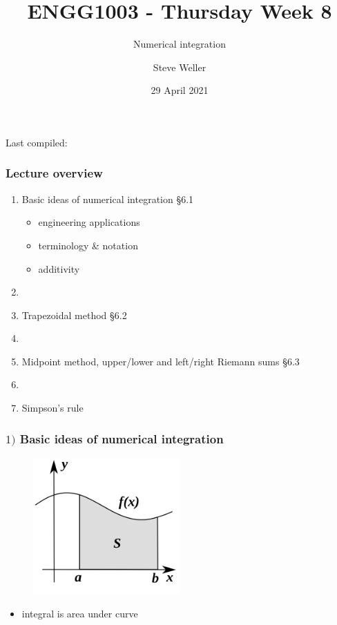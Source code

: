 \documentclass[english,14pt]{beamer}
\title{ENGG1003 - Thursday Week 8}
\subtitle{Numerical integration }%
\author{Steve Weller}
\institute{University of Newcastle}
\date{29 April 2021}
\newcommand\red[1]{{\color{red} #1}}
\begin{document}
\begin{flushleft}
{\scriptsize Last compiled:~\DTMnow}
\vspace*{-5mm}
\end{flushleft}
\framebreak


\begin{frame}[fragile]

\frametitle{Lecture overview}
\begin{enumerate}
	\item Basic ideas of numerical integration \red{\S6.1}
	\begin{itemize}
		\item engineering applications
		\item terminology \& notation
		\item additivity
	\end{itemize}
	
	\item[]
	
	\item Trapezoidal method \red{\S6.2}
	
	\item[]
	
	\item Midpoint method, upper/lower and left/right Riemann sums \red{\S6.3}
	
	\item[]
	
	\item Simpson's rule
	
\end{enumerate}

\end{frame}


\begin{frame}[fragile]

\frametitle{$1)$ Basic ideas of numerical integration}

\begin{figure}[ht]
	\centering
	\includegraphics[width=0.5\textwidth]{figures/integralArea}
\end{figure}

\begin{itemize}
	\item integral is area under curve
\end{itemize}

\end{frame}
\end{document}
